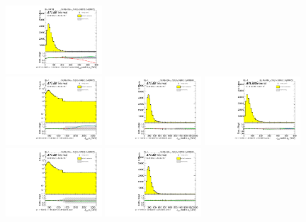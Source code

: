 \begin{figure}[htbp!]
\begin{center}
\includegraphics[width=0.32\textwidth,angle=-90]{figures/boosted/Reweight/Fits/Moriond_bkg_0_NoTag_2Trk_split_lead_Incl_sublHCand_trk1_Pt.pdf} \\
\includegraphics[width=0.32\textwidth,angle=-90]{figures/boosted/Reweight/Fits/Moriond_bkg_3_NoTag_2Trk_split_lead_Incl_sublHCand_Pt_m_1.pdf}
\includegraphics[width=0.32\textwidth,angle=-90]{figures/boosted/Reweight/Fits/Moriond_bkg_3_NoTag_2Trk_split_lead_Incl_sublHCand_trk0_Pt.pdf}
\includegraphics[width=0.32\textwidth,angle=-90]{figures/boosted/Reweight/Fits/Moriond_bkg_3_NoTag_2Trk_split_lead_Incl_sublHCand_trk1_Pt.pdf} \\
\includegraphics[width=0.32\textwidth,angle=-90]{figures/boosted/Reweight/Fits/Moriond_bkg_9_NoTag_2Trk_split_lead_Incl_sublHCand_Pt_m_1.pdf}
\includegraphics[width=0.32\textwidth,angle=-90]{figures/boosted/Reweight/Fits/Moriond_bkg_9_NoTag_2Trk_split_lead_Incl_sublHCand_trk0_Pt.pdf}

\end{center}
\end{figure}
